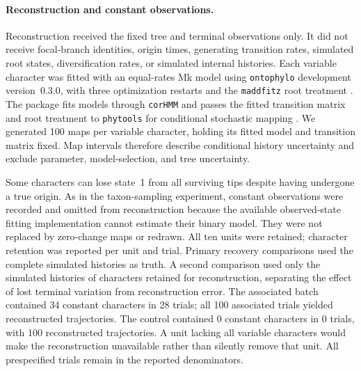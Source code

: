 \paragraph{Reconstruction and constant observations.}
Reconstruction received the fixed tree and terminal observations only.
It did not receive focal-branch identities, origin times, generating transition
rates, simulated root states, diversification rates, or simulated internal histories. Each variable character was fitted
with an equal-rates Mk model using \texttt{ontophylo} development version~0.3.0,
with three optimization restarts and the \texttt{maddfitz} root treatment
\citep{fitzjohn2009}. The package fits models through \texttt{corHMM} and
passes the fitted transition matrix and root treatment to \texttt{phytools}
for conditional stochastic mapping \citep{corHMM,revell2024}.
We generated 100 maps per variable character, holding its fitted model and
transition matrix fixed. Map intervals therefore describe conditional
history uncertainty and exclude parameter, model-selection, and tree uncertainty.

Some characters can lose state~1 from all surviving tips despite having
undergone a true origin. As in the taxon-sampling experiment, constant
observations were recorded and omitted from reconstruction because the
available observed-state fitting implementation cannot estimate their
binary model. They were not replaced by zero-change maps or redrawn.
All ten units were retained; character retention was reported per unit and
trial. Primary recovery comparisons used the complete simulated histories
as truth. A second comparison used only the simulated histories of characters
retained for reconstruction, separating the effect of lost terminal
variation from reconstruction error. The associated batch contained
34 constant characters in 28 trials; all 100 associated trials yielded
reconstructed trajectories. The control contained 0 constant
characters in 0 trials, with 100 reconstructed
trajectories. A unit lacking all variable characters would make the
reconstruction unavailable rather than silently remove that unit.
All prespecified trials remain in the reported denominators.


